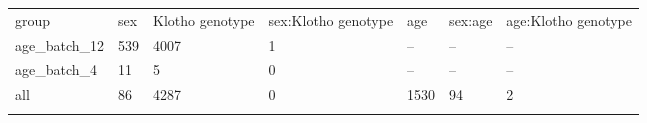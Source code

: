 \begin{tabular}{lllllll}
	group & sex & Klotho genotype & sex:Klotho genotype & age & sex:age & age:Klotho genotype\\
	age\_batch\_12 & 539 & 4007 & 1 & -- & -- & --\\
	age\_batch\_4 & 11 & 5 & 0 & -- & -- & --\\
	all & 86 & 4287 & 0 & 1530 & 94 & 2\\
	\\
\end{tabular}
